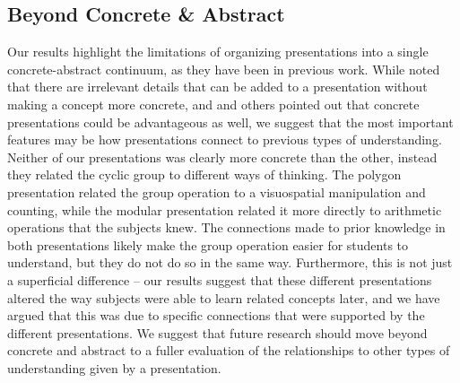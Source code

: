 \documentclass[man,10pt]{apa6}
\begin{document}
\subsection{Beyond Concrete \& Abstract}
Our results highlight the limitations of organizing presentations into a single concrete-abstract continuum, as they have been in previous work. While  noted that there are irrelevant details that can be added to a presentation without making a concept more concrete, and  and others pointed out that concrete presentations could be advantageous as well, we suggest that the most important features may be how presentations connect to previous types of understanding. Neither of our presentations was clearly more concrete than the other, instead they related the cyclic group to different ways of thinking. The polygon presentation related the group operation to a visuospatial manipulation and counting, while the modular presentation related it more directly to arithmetic operations that the subjects knew. The connections made to prior knowledge in both presentations likely make the group operation easier for students to understand, but they do not do so in the same way. Furthermore, this is not just a superficial difference -- our results suggest that these different presentations altered the way subjects were able to learn related concepts later, and we have argued that this was due to specific connections that were supported by the different presentations. We suggest that future research should move beyond concrete and abstract to a fuller evaluation of the relationships to other types of understanding given by a presentation. \par
\end{document}
